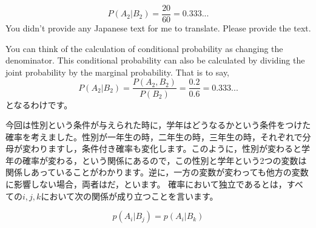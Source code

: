 \documentclass{ltjsbook}
\begin{document}



\[P(A_2|B_2)=\frac{20}{60}=0.333... \]
You didn't provide any Japanese text for me to translate. Please provide the text.

You can think of the calculation of conditional probability as changing the denominator. This conditional probability can also be calculated by dividing the joint probability by the marginal probability. That is to say,
\[ P(A_2|B_2) = \frac{P(A_2,B_2)}{P(B_2)}=\frac{0.2}{0.6}=0.333... \]
となるわけです。

今回は性別という条件が与えられた時に，学年はどうなるかという条件をつけた確率を考えました。性別が一年生の時，二年生の時，三年生の時，それぞれで分母が変わりますし，条件付き確率も変化します。このように，性別が変わると学年の確率が変わる，という関係にあるので，この性別と学年という2つの変数は関係しあっていることがわかります。逆に，一方の変数が変わっても他方の変数に影響しない場合，両者はだ，といます。
確率において独立であるとは，すべての$i,j,k$において次の関係が成り立つことを言います。

\[ p(A_i| B_j) = p(A_i|B_k) \]
\end{document}
